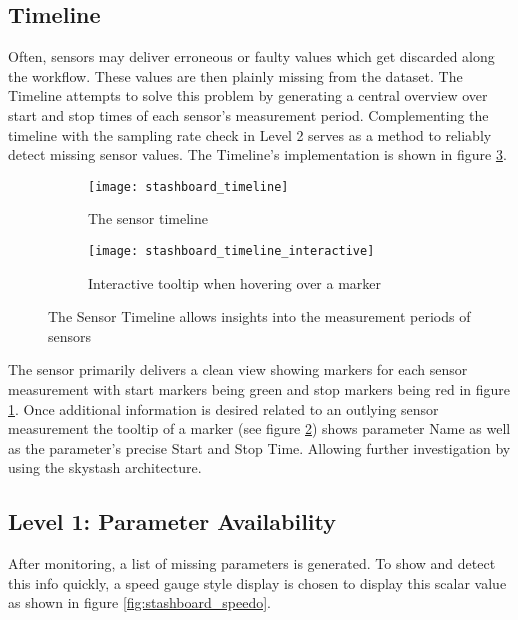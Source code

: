 \subsection{Timeline}

Often, sensors may deliver erroneous or faulty values which get discarded along the workflow. These values are then plainly missing from the dataset. The Timeline attempts to solve this problem by generating a central overview over start and stop times of each sensor's measurement period. Complementing the timeline with the sampling rate check in Level 2 serves as a method to reliably detect missing sensor values. The Timeline's implementation is shown in figure \ref{fig:stashboard_timeline}.

\begin{figure}[!h]
    \centering
    \begin{subfigure}[b]{1\textwidth}
        \texttt{[image: stashboard\_timeline]}
        \caption{The sensor timeline}
        \label{fig:stashboard_timeline_clean}
    \end{subfigure}
    \begin{subfigure}[b]{1\textwidth}
        \texttt{[image: stashboard\_timeline\_interactive]}
        \caption{Interactive tooltip when hovering over a marker}
        \label{fig:stashboard_timeline_interactive}
    \end{subfigure}
    \caption{The Sensor Timeline allows insights into the measurement periods of sensors}
    \label{fig:stashboard_timeline}
\end{figure}

The sensor primarily delivers a clean view showing markers for each sensor measurement with start markers being green and stop markers being red in figure \ref{fig:stashboard_timeline_clean}. Once additional information is desired related to an outlying sensor measurement the tooltip of a marker (see figure \ref{fig:stashboard_timeline_interactive}) shows parameter Name as well as the parameter's precise Start and Stop Time. Allowing further investigation by using the skystash architecture.

\subsection{Level 1: Parameter Availability}
After monitoring, a list of missing parameters is generated. To show and detect this info quickly, a speed gauge style display is chosen to display this scalar value as shown in figure \ref{fig:stashboard_speedo}.


